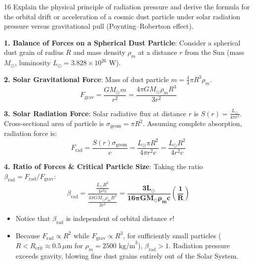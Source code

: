 \begin{theoryq}{16}
Explain the physical principle of radiation pressure and derive the formula for the orbital drift or acceleration of a cosmic dust particle under solar radiation pressure versus gravitational pull (Poynting--Robertson effect).
\end{theoryq}
\begin{theorysol}
\textbf{1. Balance of Forces on a Spherical Dust Particle}:
Consider a spherical dust grain of radius $R$ and mass density $\rho_m$ at a distance $r$ from the Sun (mass $M_\odot$, luminosity $L_\odot = 3.828 \times 10^{26}\text{ W}$).

\textbf{2. Solar Gravitational Force}:
Mass of dust particle $m = \frac{4}{3}\pi R^3 \rho_m$.
\begin{equation}
F_{\text{grav}} = \frac{G M_\odot m}{r^2} = \frac{4\pi G M_\odot \rho_m R^3}{3 r^2}
\end{equation}

\textbf{3. Solar Radiation Force}:
Solar radiative flux at distance $r$ is $S(r) = \frac{L_\odot}{4\pi r^2}$.
Cross-sectional area of particle is $\sigma_{\text{geom}} = \pi R^2$.
Assuming complete absorption, radiation force is:
\begin{equation}
F_{\text{rad}} = \frac{S(r)\sigma_{\text{geom}}}{c} = \frac{L_\odot \pi R^2}{4\pi r^2 c} = \frac{L_\odot R^2}{4 r^2 c}
\end{equation}

\textbf{4. Ratio of Forces \& Critical Particle Size}:
Taking the ratio $\beta_{\text{rad}} = F_{\text{rad}} / F_{\text{grav}}$:
\begin{equation}
\beta_{\text{rad}} = \frac{\frac{L_\odot R^2}{4 r^2 c}}{\frac{4\pi G M_\odot \rho_m R^3}{3 r^2}} = \mathbf{\frac{3 L_\odot}{16\pi G M_\odot \rho_m c}\left(\frac{1}{R}\right)}
\end{equation}
\begin{itemize}
    \item Notice that $\beta_{\text{rad}}$ is independent of orbital distance $r$!
    \item Because $F_{\text{rad}} \propto R^2$ while $F_{\text{grav}} \propto R^3$, for sufficiently small particles ($R < R_{\text{crit}} \approx 0.5\,\mu\text{m}$ for $\rho_m = 2500\text{ kg/m}^3$), $\beta_{\text{rad}} > 1$. Radiation pressure exceeds gravity, blowing fine dust grains entirely out of the Solar System.
\end{itemize}
\end{theorysol}
\vspace{4mm}

